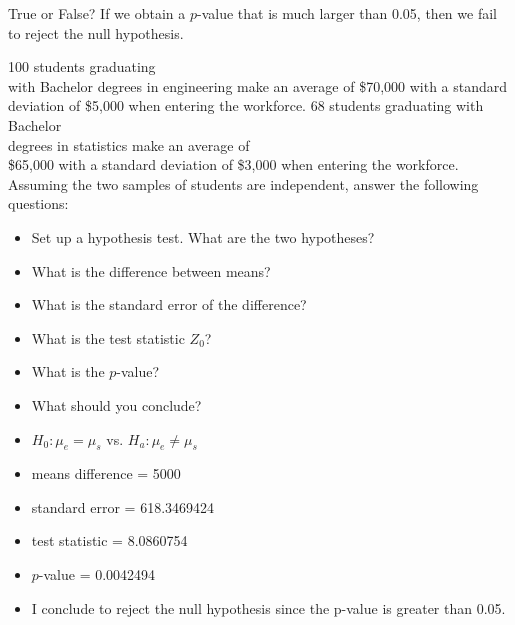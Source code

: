 \documentclass[11pt, chapterprefix=true]{scrbook}\usepackage[]{graphicx}\usepackage[]{color}
\begin{document}
\begin{exercises}
\begin{exercise}
True or False? If we obtain a $p$-value that is much larger than 0.05, then we fail to reject the null hypothesis.

\end{exercise}
% 
% 

\begin{exercise}  %



100 students graduating \\ with Bachelor degrees in engineering make an average of \$70,000 with a standard deviation of \$5,000 when entering the workforce. 68 students graduating with Bachelor \\ degrees in statistics make an average of \\  \$65,000 with a standard deviation of \$3,000 when entering the workforce. Assuming the two samples of students are independent, answer the following questions:

\begin{itemize}
  \item Set up a hypothesis test. What are the two hypotheses?
  \item What is the difference between means?
  \item What is the standard error of the difference?
  \item What is the test statistic $Z_0$?
  \item What is the $p$-value?
  \item What should you conclude?
\end{itemize}

\end{exercise}
\begin{solution}  %

\begin{itemize}
  \item $H_0: \mu_e = \mu_s$ vs. $H_a: \mu_e \ne \mu_s$
  \item  means difference = 5000
  \item  standard error  = 618.3469424
  \item  test statistic = 8.0860754
  \item  $p$-value = 0.0042494
  \item  I conclude to reject the null hypothesis since the p-value is greater than 0.05.
\end{itemize}

\end{solution}



\end{exercises}
\end{document}
